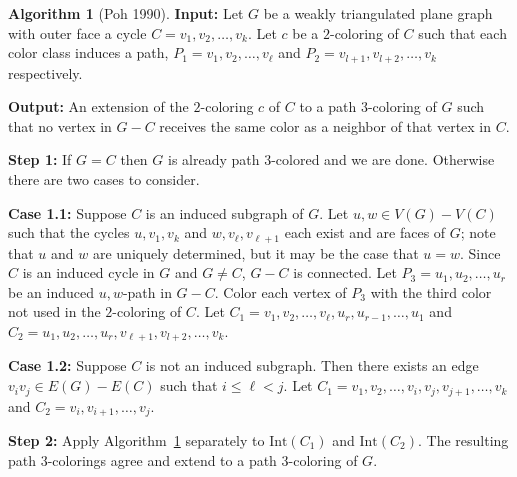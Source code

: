 \documentclass[12pt,letterpaper]{article}
\theoremstyle{plain}
\theoremstyle{definition}
\theoremstyle{break}
\newtheorem{algorithm}[lemma]{Algorithm}     %
\begin{document}
\begin{algorithm}[Poh 1990]\label{A:planar3}
\textbf{Input:} Let $G$ be a weakly triangulated plane graph with outer face a
cycle $C=v_1,v_2,\ldots, v_k$. Let $c$ be a $2$-coloring of $C$ such
that each color class induces a path, $P_1=v_1,v_2,\ldots, v_\ell$ and
$P_2=v_{l+1},v_{l+2},\ldots, v_k$ respectively.

\textbf{Output:} An extension of the $2$-coloring $c$ of $C$ to a path
$3$-coloring of $G$ such that no vertex in $G-C$ receives the same color as a
neighbor of that vertex in $C$.

\textbf{Step 1:} If $G=C$ then $G$ is already path $3$-colored and we
are done. Otherwise there are two cases to consider.

\textbf{Case 1.1:} Suppose $C$ is an induced subgraph of $G$. Let
$u,w\in V(G)-V(C)$ such that the cycles $u,v_1,v_k$ and $w,v_\ell,v_{\ell+1}$ each
exist and are faces of $G$; note that
$u$ and $w$ are uniquely determined, but it may be the case that $u=w$. Since
$C$ is an induced cycle in $G$ and
$G\ne C$, $G-C$ is connected.
Let $P_3=u_1,u_2,\ldots,u_r$ be an induced $u,w$-path in $G-C$.
Color each vertex of $P_3$ with the third color not used in the $2$-coloring of
$C$. Let $C_1=v_1,v_2,\ldots,v_\ell,u_r,u_{r-1},\ldots,u_1$ and
$C_2=u_1,u_2,\ldots,u_r,v_{\ell+1},v_{l+2},\ldots,v_k$.

\textbf{Case 1.2:} Suppose $C$ is not an induced subgraph. Then there
exists an edge $v_iv_j\in E(G)-E(C)$ such that $i\le \ell < j$. Let
$C_1=v_1,v_2,\ldots,v_i,v_j,v_{j+1},\ldots,v_k$
and $C_2=v_i,v_{i+1},\ldots,v_j$.

\textbf{Step 2:} Apply Algorithm~\ref{A:planar3} separately to $\text{Int}(C_1)$
and $\text{Int}(C_2)$. The resulting path $3$-colorings agree and extend to
a path $3$-coloring of $G$. 
\end{algorithm}
\end{document}
